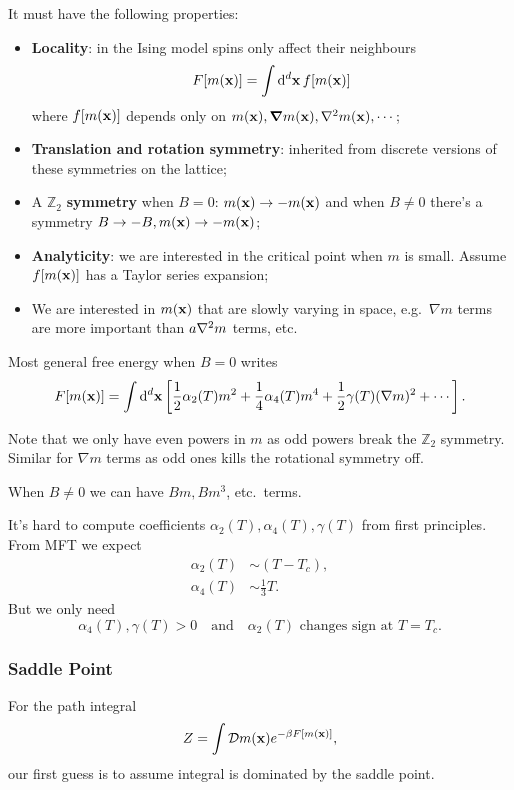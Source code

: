 \documentclass[a4paper,11pt]{article}
\begin{document}
	It must have the following properties:
	\begin{itemize}
		\item \textbf{Locality}: in the Ising model spins only affect their neighbours \[
			F[m(\vb x)] = \int \dd[d]{\vb x} f[m(\vb x)]
		\]
		where $f[m(\vb x)]$ depends only on $m(\vb x), \grad m(\vb x), \laplacian m(\vb x), \cdots$;
		\item \textbf{Translation and rotation symmetry}: inherited from discrete versions of these symmetries on the lattice;
		\item A $\mathbb{Z}_2$ \textbf{symmetry} when $B = 0$: $m(\vb x) \to - m(\vb x)$ and when $B \neq 0$ there's a symmetry $B \to - B, m(\vb x) \to - m(\vb x)$;
		\item \textbf{Analyticity}: we are interested in the critical point when $m$ is small. Assume $f[m(\vb x)]$ has a Taylor series expansion;
		\item We are interested in $m(\vb x)$ that are slowly varying in space, e.g.\ $\nabla m$ terms are more important than $a \laplacian m$ terms, etc.
	\end{itemize}

	Most general free energy when $B = 0$ writes
	\[
		F[m(\vb x)] = \int \dd[d]{\vb x} \left[ \frac{1}{2} \alpha_2(T) m^2 + \frac{1}{4} \alpha_4(T) m^4 + \frac{1}{2} \gamma(T) (\nabla m)^2 + \cdots \right].
	\]
	
	Note that we only have even powers in $m$ as odd powers break the $\mathbb{Z}_2$ symmetry. Similar for $\nabla m$ terms as odd ones kills the rotational symmetry off.

	When $B \neq 0$ we can have $Bm, Bm^3$, etc.\ terms.

	It's hard to compute coefficients $\alpha_2(T), \alpha_4(T), \gamma(T)$ from first principles. From MFT we expect
	\begin{align*}
		\alpha_2(T) & \sim (T - T_c),\\
		\alpha_4(T) & \sim \frac{1}{3}T.
	\end{align*}
	But we only need
	\[
		\alpha_4(T), \gamma(T) > 0 \quad \text{and} \quad \alpha_2(T) \text{ changes sign at } T = T_c.
	\]
	
	\subsubsection{Saddle Point}
	For the path integral 
	\[
		Z = \int \mathcal{D} m(\vb x) e^{-\beta F[m(\vb x)]},
	\]
	our first guess is to assume integral is dominated by the saddle point.
\end{document}
